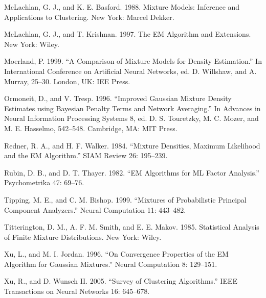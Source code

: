 McLachlan, G. J., and K. E. Basford. 1988. Mixture Models: Inference and Applications to Clustering. New York: Marcel Dekker.

McLachlan, G. J., and T. Krishnan. 1997. The EM Algorithm and Extensions. New York: Wiley.

Moerland, P. 1999. “A Comparison of Mixture Models for Density Estimation.” In International Conference on Artificial Neural Networks, ed. D. Willshaw, and A. Murray, 25--30. London, UK: IEE Press.

Ormoneit, D., and V. Tresp. 1996. “Improved Gaussian Mixture Density Estimates using Bayesian Penalty Terms and Network Averaging.” In Advances in Neural Information Processing Systems 8, ed. D. S. Touretzky, M. C. Mozer, and M. E. Hasselmo, 542--548. Cambridge, MA: MIT Press.

Redner, R. A., and H. F. Walker. 1984. “Mixture Densities, Maximum Likelihood and the EM Algorithm.” SIAM Review 26: 195--239.

Rubin, D. B., and D. T. Thayer. 1982. “EM Algorithms for ML Factor Analysis.” Psychometrika 47: 69--76.

Tipping, M. E., and C. M. Bishop. 1999. “Mixtures of Probabilistic Principal Component Analyzers.” Neural Computation 11: 443--482.

Titterington, D. M., A. F. M. Smith, and E. E. Makov. 1985. Statistical Analysis of Finite Mixture Distributions. New York: Wiley.

Xu, L., and M. I. Jordan. 1996. “On Convergence Properties of the EM Algorithm for Gaussian Mixtures.” Neural Computation 8: 129--151.

Xu, R., and D. Wunsch II. 2005. “Survey of Clustering Algorithms.” IEEE Transactions on Neural Networks 16: 645--678.
